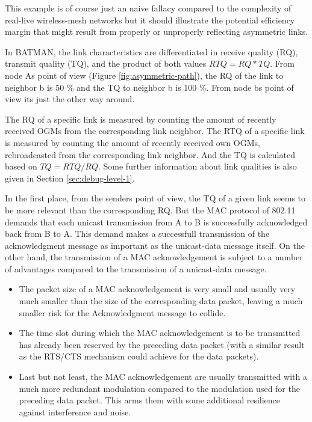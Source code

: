 \documentclass[11pt]{article}
\begin{document}
This example is of course just an naive fallacy compared to the complexity of real-live wireless-mesh networks but it should illustrate the potential efficiency margin that might result from properly or unproperly reflecting asymmetric links.



In BATMAN, the link characteristics are differentiated in receive quality (RQ), transmit quality (TQ), and the product of both values $RTQ = RQ * TQ$.
%
%
From node As point of view (Figure \ref{fig:asymmetric-path}), the RQ of the link to neighbor b is 50 \% and the TQ to neighbor b is 100 \%. From node bs point of view its just the other way around. 

The RQ of a specific link is measured by counting the amount of recently received OGMs from the corresponding link neighbor.
%
The RTQ of a specific link is measured by counting the amount of recently received own OGMs, rebroadcasted from the corresponding link neighbor.
%
And the TQ is calculated based on $TQ = RTQ / RQ$.
%
Some further information about link qualities is also given in Section \ref{sec:debug-level-1}.

%
In the first place, from the senders point of view, the TQ of a given link seems to be more relevant than the corresponding RQ.
%
But the MAC protocol of 802.11 \cite{ieee80211} demands that each unicast transmission from A to B is successfully acknowledged back from B to A. 
%
This demand makes a successfull transmission of the acknowledgment message as important as the unicast-data message itself.
%
On the other hand, the transmission of a MAC acknowledgement is subject to a number of advantages compared to the transmission of a unicast-data message.
 
\begin{itemize}
  \item  The packet size of a MAC acknowledgement is very small and usually very much smaller than the size of the corresponding data packet, leaving a much smaller risk for the Acknowledgment message to collide.

 \item The time slot during which the MAC acknowledgement is to be transmitted has already been reserved by the preceding data packet (with a similar result as the RTS/CTS mechanism could achieve for the data packets).

 \item Last but not least, the MAC acknowledgement are usually transmitted with a much more redundant modulation compared to the modulation used for the preceding data packet. This arms them with some additional resilience against interference and noise.

\end{itemize}
\end{document}
